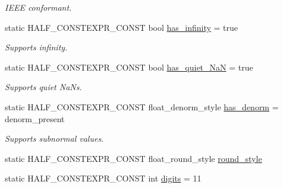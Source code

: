 \begin{DoxyCompactItemize}
\begin{DoxyCompactList}\small\item\em I\+E\+EE conformant. \end{DoxyCompactList}\item 
static H\+A\+L\+F\+\_\+\+C\+O\+N\+S\+T\+E\+X\+P\+R\+\_\+\+C\+O\+N\+ST bool \hyperlink{classstd_1_1numeric__limits_3_01half__float_1_1half_01_4_a808d88d6c6782112d8c8ce51ee77c4dd}{has\+\_\+infinity} = true\hypertarget{classstd_1_1numeric__limits_3_01half__float_1_1half_01_4_a808d88d6c6782112d8c8ce51ee77c4dd}{}\label{classstd_1_1numeric__limits_3_01half__float_1_1half_01_4_a808d88d6c6782112d8c8ce51ee77c4dd}

\begin{DoxyCompactList}\small\item\em Supports infinity. \end{DoxyCompactList}\item 
static H\+A\+L\+F\+\_\+\+C\+O\+N\+S\+T\+E\+X\+P\+R\+\_\+\+C\+O\+N\+ST bool \hyperlink{classstd_1_1numeric__limits_3_01half__float_1_1half_01_4_a83611ff822d78d69ed6fd58c4ba48c33}{has\+\_\+quiet\+\_\+\+NaN} = true\hypertarget{classstd_1_1numeric__limits_3_01half__float_1_1half_01_4_a83611ff822d78d69ed6fd58c4ba48c33}{}\label{classstd_1_1numeric__limits_3_01half__float_1_1half_01_4_a83611ff822d78d69ed6fd58c4ba48c33}

\begin{DoxyCompactList}\small\item\em Supports quiet Na\+Ns. \end{DoxyCompactList}\item 
static H\+A\+L\+F\+\_\+\+C\+O\+N\+S\+T\+E\+X\+P\+R\+\_\+\+C\+O\+N\+ST float\+\_\+denorm\+\_\+style \hyperlink{classstd_1_1numeric__limits_3_01half__float_1_1half_01_4_a120d8b8b5e5c5d5ba0d7d3802859ee4f}{has\+\_\+denorm} = denorm\+\_\+present\hypertarget{classstd_1_1numeric__limits_3_01half__float_1_1half_01_4_a120d8b8b5e5c5d5ba0d7d3802859ee4f}{}\label{classstd_1_1numeric__limits_3_01half__float_1_1half_01_4_a120d8b8b5e5c5d5ba0d7d3802859ee4f}

\begin{DoxyCompactList}\small\item\em Supports subnormal values. \end{DoxyCompactList}\item 
static H\+A\+L\+F\+\_\+\+C\+O\+N\+S\+T\+E\+X\+P\+R\+\_\+\+C\+O\+N\+ST float\+\_\+round\+\_\+style \hyperlink{classstd_1_1numeric__limits_3_01half__float_1_1half_01_4_a17a70ce9e02f8b890a0ebf5eb04c385b}{round\+\_\+style}
\item 
static H\+A\+L\+F\+\_\+\+C\+O\+N\+S\+T\+E\+X\+P\+R\+\_\+\+C\+O\+N\+ST int \hyperlink{classstd_1_1numeric__limits_3_01half__float_1_1half_01_4_a25dd523e9495b75166757d5f73197068}{digits} = 11\hypertarget{classstd_1_1numeric__limits_3_01half__float_1_1half_01_4_a25dd523e9495b75166757d5f73197068}{}\label{classstd_1_1numeric__limits_3_01half__float_1_1half_01_4_a25dd523e9495b75166757d5f73197068}


\end{DoxyCompactItemize}
